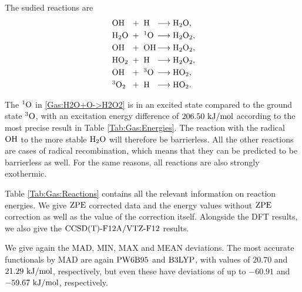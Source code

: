 \documentclass[8.5pt,twoside,twocolumn]{article}
\newcommand\zpe{\enmat{\te{ZPE}}}
\newcommand\singo{\enmat{{^1\te{O}}}}
\newcommand\tripo{\enmat{{^3\te{O}}}}
\newcommand\kmo{\enmat{\te {kJ/mol}}}
\theoremstyle{standard}
\begin{document}
The sudied reactions are
\newcommand\ronebox[1]{\makebox[.8cm][l]{\enmat{#1}}}
\newcommand\rtwobox[1]{\makebox[.7cm][l]{\ \enmat{#1}}}
\newcommand\prodbox[1]{\makebox[1.55cm][l]{\enmat{#1}}}
\begin{subequations}
\begin{align}
   \label{Gas:HO+H->H2O}
   \ronebox{\ho}+\rtwobox{\te{H}}\prodbox{\chemar\hto,} \\ 
   \label{Gas:H2O+O->H2O2}
   \ronebox{\hto}+\rtwobox{^1\te{O}}\prodbox{\chemar\htot,} \\
   \label{Gas:HO+HO->H2O2}
   \ronebox{\ho}+\rtwobox{\ho}\prodbox{\chemar\htot,} \\
   \label{Gas:HO2+H->H2O2}
   \ronebox{\hot}+\rtwobox{\te{H}}\prodbox{\chemar\htot,} \\
   \label{Gas:HO+O->HO2}
   \ronebox{\ho}+\rtwobox{^3\te{O}}\prodbox{\chemar\hot,} \\
   \label{Gas:3O2+H->HO2}
   \ronebox{^3\ot}+\rtwobox{\te{H}}\prodbox{\chemar\hot.}
\end{align}
\label{Gas:Reactions}
\end{subequations}

The $\singo$ in \eqref{Gas:H2O+O->H2O2} is in an excited state
compared to the ground state $\tripo$, with an excitation energy difference
of $206.50~\kmo$ according to the most precise result in Table
\ref{Tab:Gas:Energies}. The reaction with the radical $\text O \text H$ to the more stable
$\text H _2 \text O$ will therefore be barrierless. All the other reactions are cases of
radical recombination, which means that they can be predicted to be barrierless
as well. For the same reasons, all reactions are also strongly exothermic.

Table \ref{Tab:Gas:Reactions} contains all the relevant information on
reaction energies. We give $\zpe$ corrected data and the energy
values without $\zpe$ correction as well as the value of the correction
itself. Alongside the DFT results, we also give the $\text{CCSD(T)-F12A}/\text{VTZ-F}12$ results.

We give again the MAD, MIN, MAX and MEAN deviations.
The most accurate functionals by MAD are again $\text{PW6B95}$
and $\text{B3LYP}$, with values of $20.70$ and $21.29~\kmo$, respectively,
but even these have deviations of up to $-60.91$ and $-59.67~\kmo$,
respectively.
\end{document}
